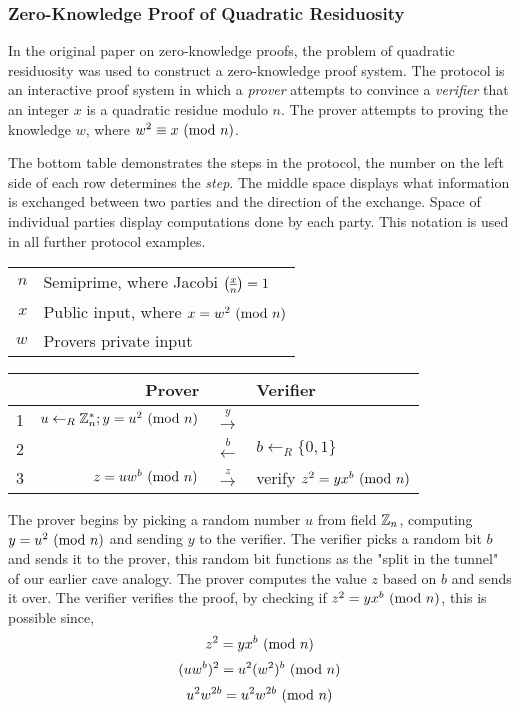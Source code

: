 \newpage
\subsubsection{Zero-Knowledge Proof of Quadratic Residuosity}
In the original paper \cite{goldwasser1989knowledge} on zero-knowledge proofs, the problem of quadratic residuosity was used to construct a zero-knowledge proof system.
The protocol is an interactive proof system in which a \textit{prover} attempts to convince a \textit{verifier} that an integer $x$ is a quadratic residue modulo $n$. 
The prover attempts to proving the knowledge $w$, where $w^2 \equiv x \ (\mathrm{mod}\ n)$.


\bigskip
The bottom table demonstrates the steps in the protocol, 
the number on the left side of each row determines the \textit{step}.
The middle space displays what information is exchanged between two parties and the direction of the exchange.
Space of individual parties display computations done by each party. 
This notation is used in all further protocol examples.\\
\begin{center}
	\begin{tabular}{rl}
		$n$ & Semiprime, where Jacobi $\legendre{x}{n} = 1$\\
 		$x$ & Public input, where $x = w^2 \ (\mathrm{mod}\ n)$\\
 		$w$ & Provers private input\\
	\end{tabular}
\end{center}
\begin{center}
	\begin{tabular}{r|r|c|l}
		& Prover && Verifier\\
		\hline
		1&$u \leftarrow_R \Bbb{Z}_{n}^{*}; y = u^2 \ (\mathrm{mod}\ n)$ & $\xrightarrow{y}$\\
		2 & & $\xleftarrow{b}$ & $b \leftarrow_R \{0, 1\} $\\
		3 &$z = uw^b\ (\mathrm{mod}\ n)$ & $\xrightarrow z$ & verify $z^2 = yx^b \ (\mathrm{mod}\ n)$\\
	\end{tabular}
\end{center}
\bigskip
The prover begins by picking a random number $u$ from field $\Bbb{Z}_{n}$, computing $y = u^2 \ (\mathrm{mod}\ n)$ and sending $y$ to the verifier.
The verifier picks a random bit $b$ and sends it to the prover, this random bit functions as the "split in the tunnel" of our earlier cave analogy.
The prover computes the value $z$ based on $b$ and sends it over.
The verifier verifies the proof, by checking if $z^2 = yx^b \ (\mathrm{mod}\ n)$, this is possible since,
$$z^2 = yx^b \ (\mathrm{mod}\ n)$$
$$(uw^b)^2 = u^2(w^2)^b \ (\mathrm{mod}\ n)$$
$$u^2w^{2b} = u^2w^{2b} \ (\mathrm{mod}\ n)$$

